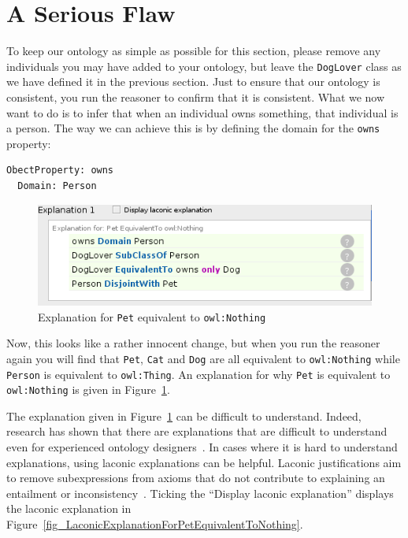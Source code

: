 \documentclass{amsart}
\begin{document}
  \section{A Serious Flaw}
  To keep our ontology as simple as possible for this section, please remove any individuals you may have added to your ontology, but leave the \texttt{DogLover} class as we have defined it in the previous section. Just to ensure that our ontology is consistent, you run the reasoner to confirm that it is consistent. What we now want to do is to infer that when an individual owns something, that individual is a person. The way we can achieve this is by defining the domain for the \texttt{owns} property:
\begin{small}
\begin{verbatim} 
ObectProperty: owns
  Domain: Person
\end{verbatim}
\end{small}  
    \begin{figure}
      \centering \includegraphics[trim = 0mm 0mm 0mm 0mm, clip, scale=0.65]{./ExplanationForPetEquivalentToNothing.png}
      \caption{Explanation for \texttt{Pet} equivalent to \texttt{owl:Nothing}}\label{fig_ExplanationForPetEquivalentToNothing}
    \end{figure}
    
Now, this looks like a rather innocent change, but when you run the reasoner again you will find that \texttt{Pet}, \texttt{Cat} and \texttt{Dog} are all equivalent to \texttt{owl:Nothing} while \texttt{Person} is equivalent to \texttt{owl:Thing}.
An explanation for why \texttt{Pet} is equivalent to \texttt{owl:Nothing} is given in Figure~\ref{fig_ExplanationForPetEquivalentToNothing}.

The explanation given in Figure~\ref{fig_ExplanationForPetEquivalentToNothing} can be difficult to understand. Indeed, research has shown that there are explanations that are difficult to understand even for experienced ontology designers~\cite{Horridge2011,Horridge2013}. In cases where it is hard to understand explanations, using laconic explanations can be helpful. Laconic justifications aim to remove subexpressions from axioms that do not contribute to explaining an entailment or inconsistency~\cite{Horridge2011,Horridge2013}. Ticking the ``Display laconic explanation'' displays the laconic explanation in Figure~\ref{fig_LaconicExplanationForPetEquivalentToNothing}.
\end{document}
